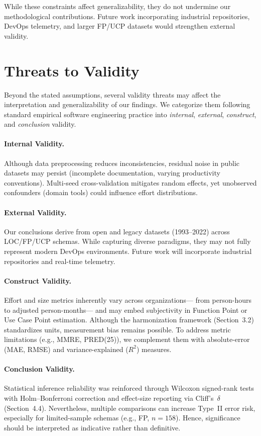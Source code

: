 \documentclass{ieeeaccess}
\begin{document}
\noindent While these constraints affect generalizability, they do not undermine our methodological contributions. Future work incorporating industrial repositories, DevOps telemetry, and larger FP/UCP datasets would strengthen external validity.

\section{Threats to Validity}
\label{sec:threats}

Beyond the stated assumptions, several validity threats may affect the interpretation and generalizability of our findings.
We categorize them following standard empirical software engineering practice 
into \textit{internal}, \textit{external}, \textit{construct}, and \textit{conclusion} validity.

\paragraph{Internal Validity.}Although data preprocessing reduces inconsistencies, residual noise in public datasets may persist (incomplete documentation, varying productivity conventions). Multi-seed cross-validation mitigates random effects, yet unobserved confounders (domain tools) could influence effort distributions.

\paragraph{External Validity.}Our conclusions derive from open and legacy datasets (1993--2022) across LOC/FP/UCP schemas. While capturing diverse paradigms, they may not fully represent modern DevOps environments. Future work will incorporate industrial repositories and real-time telemetry.

\paragraph{Construct Validity.}
Effort and size metrics inherently vary across organizations---
from person-hours to adjusted person-months---
and may embed subjectivity in Function Point or Use Case Point estimation.  
Although the harmonization framework (Section~3.2) standardizes units, 
measurement bias remains possible.
To address metric limitations (e.g., MMRE, PRED(25)),
we complement them with absolute-error (MAE, RMSE) 
and variance-explained ($R^2$) measures.

\paragraph{Conclusion Validity.}
Statistical inference reliability was reinforced through 
Wilcoxon signed-rank tests with Holm--Bonferroni correction 
and effect-size reporting via Cliff's~$\delta$ (Section~4.4).  
Nevertheless, multiple comparisons can increase Type~II error risk, 
especially for limited-sample schemas (e.g., FP, $n{=}158$).  
Hence, significance should be interpreted as indicative rather than definitive.
\end{document}
